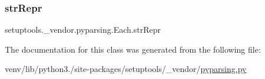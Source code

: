 \subsubsection{\texorpdfstring{str\+Repr}{strRepr}}
{\footnotesize\ttfamily setuptools.\+\_\+vendor.\+pyparsing.\+Each.\+str\+Repr}



The documentation for this class was generated from the following file\+:\begin{DoxyCompactItemize}
\item 
venv/lib/python3./site-\/packages/setuptools/\+\_\+vendor/\hyperlink{setuptools_2__vendor_2pyparsing_8py}{pyparsing.\+py}\end{DoxyCompactItemize}
